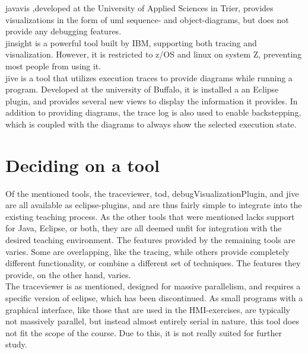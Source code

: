 \Gls{javavis} \cite{Oechsle2002},developed at the University of Applied Sciences in Trier, provides visualizations in the form of \gls{uml} sequence- and object-diagrams, but does not provide any debugging features.
~\\

\Gls{jinsight} \cite{Pauw} is a powerful tool built by IBM, supporting both tracing and visualization.
However, it is restricted to z/OS and linux on system Z, preventing most people from using it.
~\\

\Gls{jive} is a tool that utilizes execution traces to provide diagrams while running a program.
Developed at the university of Buffalo, it is installed a an Eclipse plugin, and provides several new views to display the information it provides.
In addition to providing diagrams, the trace log is also used to enable backstepping, which is coupled with the diagrams to always show the selected execution state.
~\\

\section{Deciding on a tool}\label{preDiscuss}
Of the mentioned tools, the \gls{traceviewer}, \gls{tod}, \gls{debugVisualizationPlugin}, and \gls{jive} are all available as eclipse-plugins, and are thus fairly simple to integrate into the existing teaching process.
As the other tools that were mentioned lacks support for Java, Eclipse, or both, they are all deemed unfit for integration with the desired teaching environment.
The features provided by the remaining tools are varies.
Some are overlapping, like the tracing, while others provide completely different functionality, or combine a different set of techniques.
The features they provide, on the other hand, varies.
~\\

The \gls{traceviewer} is as mentioned, designed for massive parallelism, and requires a specific version of eclipse, which has been discontinued.
As small programs with a graphical interface, like those that are used in the HMI-exercises, are typically not massively parallel, but instead almost entirely serial in nature, this tool does not fit the scope of the course.
Due to this, it is not really suited for further study.
~\\

